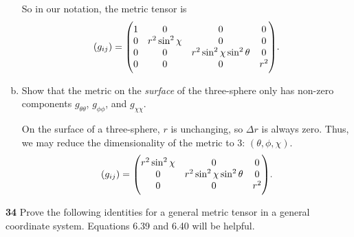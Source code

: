 \documentclass[gr-notes.tex]{subfiles}
\begin{document}
\begin{enumerate}[(a)]
So in our notation, the metric tensor is
%
\begin{displaymath}
  (g_{ij}) =
  \mqty(\dmat[0]{1, r^2\sin^2\chi, r^2\sin^2\chi\sin^2\theta, r^2}).
\end{displaymath}


\item Show that the metric on the \emph{surface} of the three-sphere only has non-zero components $g_{\theta\theta}$, $g_{\phi\phi}$, and $g_{\chi\chi}$.

On the surface of a three-sphere, $r$ is unchanging, so $\Delta r$ is always zero. Thus, we may reduce the dimensionality of the metric to 3: $(\theta,\phi,\chi)$.
%
\begin{displaymath}
  (g_{ij}) =
  \mqty(\dmat[0]{r^2\sin^2\chi, r^2\sin^2\chi\sin^2\theta, r^2}).
\end{displaymath}

\end{enumerate}


\textbf{34}
Prove the following identities for a general metric tensor in a general coordinate system. Equations 6.39 and 6.40 will be helpful.
\end{document}
